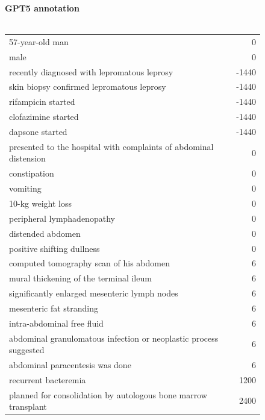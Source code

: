 \begin{figure}[!htbp]
    \begin{minipage}[!htbp]{0.49\textwidth}
    \footnotesize
        \textbf{GPT5 annotation} \\ \\
        \footnotesize
        \begin{tabular}{P{0.75\textwidth}r}
            57-year-old man & 0 \\
            male & 0 \\
            recently diagnosed with lepromatous leprosy & -1440 \\
            skin biopsy confirmed lepromatous leprosy & -1440 \\
            rifampicin started & -1440 \\
            clofazimine started & -1440 \\
            dapsone started & -1440 \\
            presented to the hospital with complaints of abdominal distension & 0 \\
            constipation & 0 \\
            vomiting & 0 \\
            10-kg weight loss & 0 \\
            peripheral lymphadenopathy & 0 \\
            distended abdomen & 0 \\
            positive shifting dullness & 0 \\
            computed tomography scan of his abdomen & 6\\
            mural thickening of the terminal ileum & 6 \\
            significantly enlarged mesenteric lymph nodes & 6 \\
            mesenteric fat stranding & 6 \\
            intra-abdominal free fluid & 6 \\
            abdominal granulomatous infection or neoplastic process suggested & 6 \\
            abdominal paracentesis was done & 6 \\
            recurrent bacteremia & 1200 \\
            planned for consolidation by autologous bone marrow transplant & 2400 \\

\end{tabular}
\end{minipage}
\end{figure}
